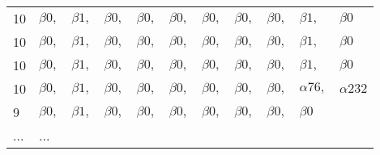 \begin{table}
\begin{tabular}{|l|llllllllll|}
    \cellcolor{amarillo} 10 & \cellcolor{verde} $\beta0,$ & \cellcolor{verde} $\beta1,$ & \cellcolor{verde} $\beta0,$ & \cellcolor{verde} $\beta0,$ & \cellcolor{verde} $\beta0,$ & \cellcolor{verde} $\beta0,$ & \cellcolor{verde} $\beta0,$ & \cellcolor{verde} $\beta0,$ & \cellcolor{amarillo} $\beta1,$ & \cellcolor{amarillo} $\beta0$ \\
    \cellcolor{amarillo} 10 & \cellcolor{verde} $\beta0,$ & \cellcolor{verde} $\beta1,$ & \cellcolor{verde} $\beta0,$ & \cellcolor{verde} $\beta0,$ & \cellcolor{verde} $\beta0,$ & \cellcolor{verde} $\beta0,$ & \cellcolor{verde} $\beta0,$ & \cellcolor{verde} $\beta0,$ & \cellcolor{amarillo} $\beta1,$ & \cellcolor{amarillo} $\beta0$ \\
    \cellcolor{amarillo} 10 & \cellcolor{verde} $\beta0,$ & \cellcolor{verde} $\beta1,$ & \cellcolor{verde} $\beta0,$ & \cellcolor{verde} $\beta0,$ & \cellcolor{verde} $\beta0,$ & \cellcolor{verde} $\beta0,$ & \cellcolor{verde} $\beta0,$ & \cellcolor{verde} $\beta0,$ & \cellcolor{amarillo} $\beta1,$ & \cellcolor{amarillo} $\beta0$ \\
    \cellcolor{blanco} 10 &  \cellcolor{azul} $\beta0,$ & \cellcolor{azul} $\beta1,$ & \cellcolor{azul} $\beta0,$ & \cellcolor{azul} $\beta0,$ & \cellcolor{azul} $\beta0,$ & \cellcolor{azul} $\beta0,$ & \cellcolor{azul} $\beta0,$ & \cellcolor{azul} $\beta0,$  & \cellcolor{blanco} $\alpha76,$ & \cellcolor{blanco} $\alpha232$ \\
    \cellcolor{blanco} 9 &  \cellcolor{azul} $\beta0,$ & \cellcolor{azul} $\beta1,$ & \cellcolor{azul} $\beta0,$ & \cellcolor{azul} $\beta0,$ & \cellcolor{azul} $\beta0,$ & \cellcolor{azul} $\beta0,$ & \cellcolor{azul} $\beta0,$ & \cellcolor{azul} $\beta0,$  & \cellcolor{blanco} $\beta0$ & \\
	\cellcolor{blanco} ... & \multicolumn{9}{l}{\cellcolor{blanco} ...} & \\
\end{tabular}
\end{table} 
